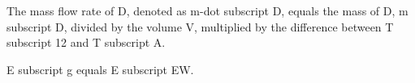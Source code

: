 The mass flow rate of D, denoted as m-dot subscript D, equals the mass of D, m subscript D, divided by the volume V, multiplied by the difference between T subscript 12 and T subscript A.

E subscript g equals E subscript EW.